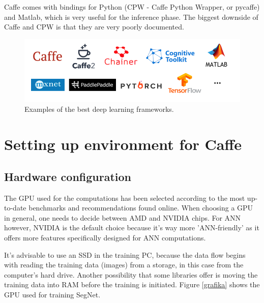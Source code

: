 Caffe comes with bindings for Python (CPW - Caffe Python Wrapper, or pycaffe) and Matlab, which is very useful for the inference phase. The biggest downside of Caffe and CPW is that they are very poorly documented.

\vspace{5mm}
\begin{figure}[h]
	\begin{center}
		\includegraphics*[width=14cm, keepaspectratio]{obr/libraries.png}
	\end{center}
	\vspace{4mm}
	\caption{Examples of the best deep learning frameworks. \cite{nvidia_dev}} 
	\label{libraries}
\end{figure} 

\newpage
\section{Setting up environment for Caffe}

\subsection{Hardware configuration}

The GPU used for the computations has been selected according to the most up-to-date benchmarks and recommendations found online. When choosing a GPU in general, one needs to decide between AMD and NVIDIA chips. For ANN however, NVIDIA is the default choice because it's way more 'ANN-friendly' as it offers more features specifically designed for ANN computations. 

It's advisable to use an SSD in the training PC, because the data flow begins with reading the training data (images) from a storage, in this case from the computer's hard drive. Another possibility that some libraries offer is moving the training data into RAM before the training is initiated. Figure \ref{grafika} shows the GPU used for training SegNet.

